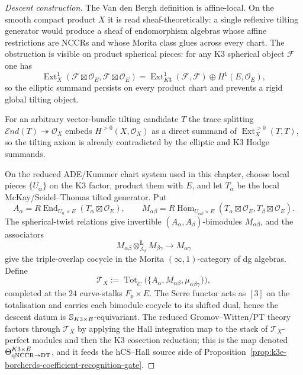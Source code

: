 \begin{proof}[Descent construction]
The Van den Bergh definition is affine-local. On the smooth compact product $X$ it is read sheaf-theoretically: a single reflexive tilting generator would produce a sheaf of endomorphism algebras whose affine restrictions are NCCRs and whose Morita class glues across every chart. The obstruction is visible on product spherical pieces: for any K3 spherical object $\mathcal F$ one has
\[
 \operatorname{Ext}^1_X(\mathcal F\boxtimes\mathcal O_E,\mathcal F\boxtimes\mathcal O_E)
 =
 \operatorname{Ext}^1_{K3}(\mathcal F,\mathcal F)\oplus H^1(E,\mathcal O_E),
\]
so the elliptic summand persists on every product chart and prevents a rigid global tilting object.

For an arbitrary vector-bundle tilting candidate $T$ the trace splitting
$\mathcal{E}nd(T)\twoheadrightarrow \mathcal O_X$ embeds $H^{>0}(X,\mathcal O_X)$ as
a direct summand of $\operatorname{Ext}^{>0}_X(T,T)$, so the tilting axiom is
already contradicted by the elliptic and K3 Hodge summands.

On the reduced ADE/Kummer chart system used in this chapter, choose local pieces
$\{U_\alpha\}$ on the K3 factor, product them with $E$, and let $T_\alpha$ be the
local McKay/Seidel--Thomas tilted generator. Put
\[
 A_\alpha = R\!\operatorname{End}_{U_\alpha\times E}(T_\alpha\boxtimes\mathcal O_E),
 \qquad
 M_{\alpha\beta} =
 R\!\operatorname{Hom}_{U_{\alpha\beta}\times E}
 (T_\alpha\boxtimes\mathcal O_E,T_\beta\boxtimes\mathcal O_E).
\]
The spherical-twist relations give invertible $(A_\alpha,A_\beta)$-bimodules $M_{\alpha\beta}$, and the associators
\[
 M_{\alpha\beta}\otimes^{\mathbf L}_{A_\beta}M_{\beta\gamma}
 \longrightarrow M_{\alpha\gamma}
\]
give the triple-overlap cocycle in the Morita $(\infty,1)$-category of dg algebras. Define
\[
 \mathcal T_X :=
 \operatorname{Tot}_{\check C}\bigl(\{A_\alpha,M_{\alpha\beta},\mu_{\alpha\beta\gamma}\}\bigr),
\]
completed at the $24$ curve-stalks $F_p\times E$. The Serre functor acts as $[3]$ on the totalisation and carries each bimodule cocycle to its shifted dual, hence the descent datum is $\mathbb{S}_{K3 \times E}$-equivariant. The reduced Gromov--Witten/PT theory factors through $\mathcal T_X$ by applying the Hall integration map to the stack of $\mathcal T_X$-perfect modules and then the K3 cosection reduction; this is the map denoted $\Theta_{\mathrm{qNCCR}\to\mathrm{DT}}^{K3\times E}$, and it feeds the hCS--Hall source side of Proposition~\ref{prop:k3e-borcherds-coefficient-recognition-gate}.
\end{proof}

